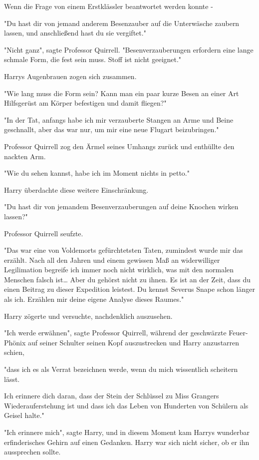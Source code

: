 {Wenn die Frage von einem Erstklässler beantwortet werden konnte -

"Du hast dir von jemand anderem Besenzauber auf die Unterwäsche zaubern lassen, und anschließend hast du sie vergiftet."

"Nicht ganz", sagte Professor Quirrell. "Besenverzauberungen erfordern eine lange schmale Form, die fest sein muss. Stoff ist nicht geeignet."

Harrys Augenbrauen zogen sich zusammen.

"Wie lang muss die Form sein? Kann man ein paar kurze Besen an einer Art Hilfsgerüst am Körper befestigen und damit fliegen?"

"In der Tat, anfangs habe ich mir verzauberte Stangen an Arme und Beine geschnallt, aber das war nur, um mir eine neue Flugart beizubringen."

Professor Quirrell zog den Ärmel seines Umhangs zurück und enthüllte den nackten Arm.

"Wie du sehen kannst, habe ich im Moment nichts in petto."

Harry überdachte diese weitere Einschränkung.

"Du hast dir von jemandem Besenverzauberungen auf deine Knochen wirken lassen?"

Professor Quirrell seufzte.

"Das war eine von Voldemorts gefürchtetsten Taten, zumindest wurde mir das erzählt. Nach all den Jahren und einem gewissen Maß an widerwilliger Legilimation begreife ich immer noch nicht wirklich, was mit den normalen Menschen falsch ist… Aber du gehörst nicht zu ihnen. Es ist an der Zeit, dass du einen Beitrag zu dieser Expedition leistest. Du kennst Severus Snape schon länger als ich. Erzählen mir deine eigene Analyse dieses Raumes."

Harry zögerte und versuchte, nachdenklich auszusehen.

"Ich werde erwähnen", sagte Professor Quirrell, während der geschwärzte Feuer-Phönix auf seiner Schulter seinen Kopf auszustrecken und Harry anzustarren schien,

"dass ich es als Verrat bezeichnen werde, wenn du mich wissentlich scheitern lässt.

Ich erinnere dich daran, dass der Stein der Schlüssel zu Miss Grangers Wiederauferstehung ist und dass ich das Leben von Hunderten von Schülern als Geisel halte."

"Ich erinnere mich", sagte Harry, und in diesem Moment kam Harrys wunderbar erfinderisches Gehirn auf einen Gedanken. Harry war sich nicht sicher, ob er ihn aussprechen sollte.

}
